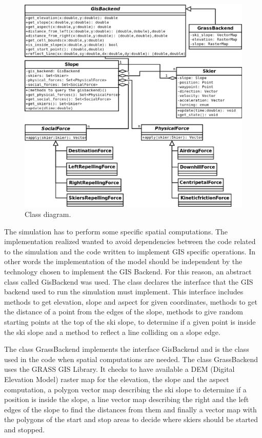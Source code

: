 \documentclass[12pt,a4paper,twoside]{book}
\begin{document}
\begin{figure}[!h]
  \begin{center}
    \includegraphics[width=\textwidth]{images/Class_diagram.eps}
    \caption{Class diagram.}\label{class_diagram}
  \end{center}
\end{figure}

The simulation has to perform some specific spatial computations. The implementation realized wanted to avoid dependencies between the code related to the simulation and the code written to implement GIS specific operations. In other words the implementation of the model should be independent by the technology chosen to implement the GIS Backend. For this reason, an abstract class called GisBackend was used. The class declares the interface that the GIS backend used to run the simulation must implement. This interface includes methods to get elevation, slope and aspect for given coordinates, methods to get the distance of a point from the edges of the slope, methods to give random starting points at the top of the ski slope, to determine if a given point is inside the ski slope and a method to reflect a line colliding on a slope edge.

The class GrassBackend implements the interface GisBackend and is the class used in the code when spatial computations are needed. The class GrassBackend uses the GRASS GIS Library. It checks to have available a DEM (Digital Elevation Model) raster map for the elevation, the slope and the aspect computation, a polygon vector map describing the ski slope to determine if a position is inside the slope, a line vector map describing the right and the left edges of the slope to find the distances from them and finally a vector map with the polygons of the start and stop areas to decide where skiers should be started and stopped.
\end{document}

